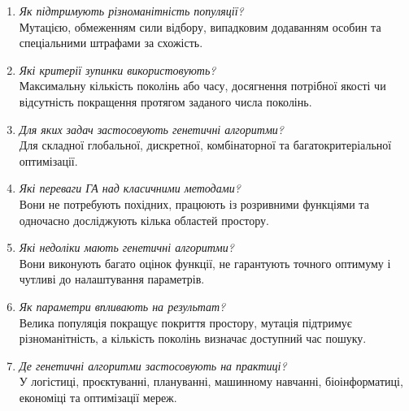 \documentclass[12pt,a4paper]{article}
\begin{document}
\begin{enumerate}[leftmargin=*]
Вона випадково змінює окремі гени, додаючи нові рішення і допомагаючи вийти з локального екстремуму.
\item \textit{Як підтримують різноманітність популяції?}\\
Мутацією, обмеженням сили відбору, випадковим додаванням особин та спеціальними штрафами за схожість.
\item \textit{Які критерії зупинки використовують?}\\
Максимальну кількість поколінь або часу, досягнення потрібної якості чи відсутність покращення протягом заданого числа поколінь.
\item \textit{Для яких задач застосовують генетичні алгоритми?}\\
Для складної глобальної, дискретної, комбінаторної та багатокритеріальної оптимізації.
\item \textit{Які переваги ГА над класичними методами?}\\
Вони не потребують похідних, працюють із розривними функціями та одночасно досліджують кілька областей простору.
\item \textit{Які недоліки мають генетичні алгоритми?}\\
Вони виконують багато оцінок функції, не гарантують точного оптимуму і чутливі до налаштування параметрів.
\item \textit{Як параметри впливають на результат?}\\
Велика популяція покращує покриття простору, мутація підтримує різноманітність, а кількість поколінь визначає доступний час пошуку.
\item \textit{Де генетичні алгоритми застосовують на практиці?}\\
У логістиці, проєктуванні, плануванні, машинному навчанні, біоінформатиці, економіці та оптимізації мереж.
\end{enumerate}
\end{document}
